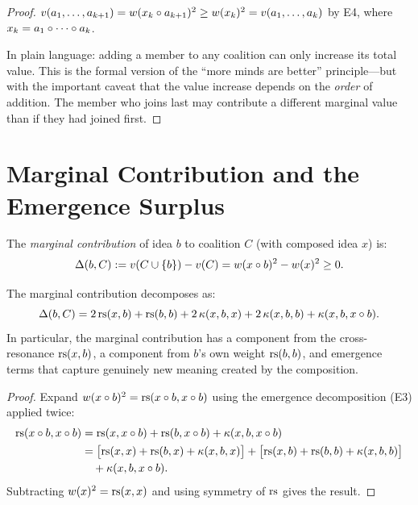 \begin{proof}
$v(a_1, \ldots, a_{k+1}) = w(x_k \circ a_{k+1})^2 \geq w(x_k)^2 =
v(a_1, \ldots, a_k)$ by E4, where $x_k = a_1 \circ \cdots \circ a_k$.

In plain language: adding a member to any coalition can only increase
its total value.  This is the formal version of the ``more minds are better''
principle---but with the important caveat that the value increase depends
on the \emph{order} of addition.  The member who joins last may contribute
a different marginal value than if they had joined first.
\end{proof}


\section{Marginal Contribution and the Emergence Surplus}

\begin{definition}
\label{def:marginal-contribution}
The \emph{marginal contribution} of idea $b$ to coalition $C$ (with composed
idea $x$) is:
\[
  \Delta(b, C) := v(C \cup \{b\}) - v(C) = w(x \circ b)^2 - w(x)^2 \geq 0.
\]
\end{definition}

\begin{theorem}
\label{thm:marginal-decomposition}
The marginal contribution decomposes as:
\[
  \Delta(b, C) = 2\,\mathrm{rs}(x, b) + \mathrm{rs}(b, b) + 2\,\kappa(x, b, x)
                 + 2\,\kappa(x, b, b) + \kappa(x, b, x \circ b).
\]
In particular, the marginal contribution has a component from the
cross-resonance $\mathrm{rs}(x, b)$, a component from $b$'s own weight $\mathrm{rs}(b,b)$,
and emergence terms that capture genuinely new meaning created by the
composition.
\end{theorem}

\begin{proof}
Expand $w(x \circ b)^2 = \mathrm{rs}(x \circ b, x \circ b)$ using the
emergence decomposition (E3) applied twice:
\begin{align*}
  \mathrm{rs}(x \circ b, x \circ b)
  &= \mathrm{rs}(x, x \circ b) + \mathrm{rs}(b, x \circ b) + \kappa(x, b, x \circ b) \\
  &= \bigl[\mathrm{rs}(x,x) + \mathrm{rs}(b,x) + \kappa(x,b,x)\bigr]
   + \bigl[\mathrm{rs}(x,b) + \mathrm{rs}(b,b) + \kappa(x,b,b)\bigr] \\
  &\quad + \kappa(x, b, x \circ b).
\end{align*}
Subtracting $w(x)^2 = \mathrm{rs}(x,x)$ and using symmetry of $\mathrm{rs}$ gives the
result.
\end{proof}

